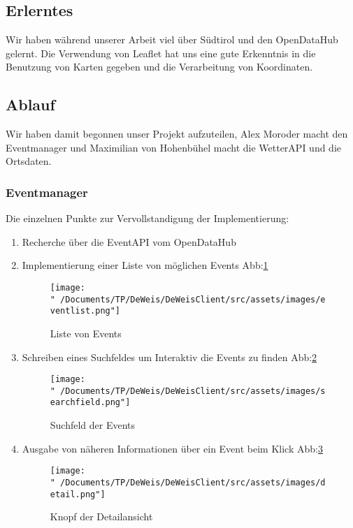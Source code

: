 \documentclass{scrartcl}
\begin{document}
    \subsection{Erlerntes}

    Wir haben während unserer Arbeit viel über Südtirol und den OpenDataHub gelernt. Die Verwendung von Leaflet hat uns eine gute 
    Erkenntnis in die Benutzung von Karten gegeben und die Verarbeitung von Koordinaten.

    \subsection{Ablauf}

    Wir haben damit begonnen unser Projekt aufzuteilen, Alex Moroder macht den Eventmanager und Maximilian von Hohenbühel 
    macht die WetterAPI und die Ortsdaten. 

    \subsubsection{Eventmanager}

    Die einzelnen Punkte zur Vervollstandigung der Implementierung:
    \begin{enumerate}
    \item Recherche über die EventAPI vom OpenDataHub
    \item Implementierung einer Liste von möglichen Events Abb:\ref{fig:events}
    \begin{figure}[!h]
    \centering
    \texttt{[image: "~/Documents/TP/DeWeis/DeWeisClient/src/assets/images/eventlist.png"]}
    \caption{Liste von Events}
    \label{fig:events}
    \end{figure}
    \item Schreiben eines Suchfeldes um Interaktiv die Events zu finden Abb:\ref{fig:search}
    \begin{figure}[h]
    \centering
    \texttt{[image: "~/Documents/TP/DeWeis/DeWeisClient/src/assets/images/searchfield.png"]}
    \caption{Suchfeld der Events}
    \label{fig:search}
    \end{figure}
    \item Ausgabe von näheren Informationen über ein Event beim Klick Abb:\ref{fig:detail}
    \begin{figure}[h]
    \centering
    \texttt{[image: "~/Documents/TP/DeWeis/DeWeisClient/src/assets/images/detail.png"]}
    \caption{Knopf der Detailansicht}
    \label{fig:detail}
    \end{figure}
    \end{enumerate}
\end{document}
